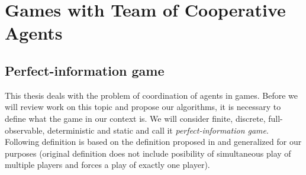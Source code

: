 \chapter{Games with Team of Cooperative Agents}
\label{chap_mas}





\section{Perfect-information game}



This thesis deals with the problem of coordination of agents in games. Before we will review
work on this topic and propose our algorithms, it is necessary to define what the game in our
context is. We will consider finite, discrete, full-observable, deterministic and static and
call it \emph{perfect-information game}. Following definition is based on the definition
proposed in \cite{MAS2008} and generalized for our purposes (original definition does not
include posibility of simultaneous play of multiple players and forces a play of exactly one
player).


